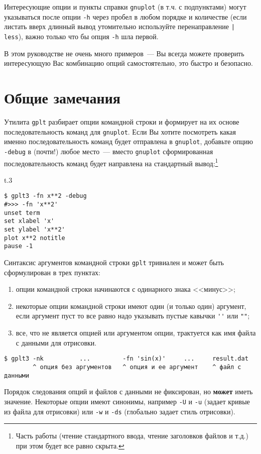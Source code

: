 \documentclass[12pt]{article}
\def\gplt{{\tt gplt}}
\def\gnuplot{{\tt gnuplot}}
\begin{document}
Интересующие опции и пункты справки \gnuplot{} (в т.ч. с подпунктами) могут указываться после опции \verb'-h' через пробел в любом порядке и количестве
(если листать вверх длинный вывод утомительно используйте перенаправление \verb'| less'), важно только что бы опция \verb'-h' шла первой.

В этом руководстве не очень много примеров~--- Вы всегда можете проверить интересующую Вас комбинацию опций самостоятельно, это быстро и безопасно. 
\pagebreak

\section{Общие замечания}
Утилита \gplt{} разбирает опции командной строки и формирует на их основе последовательность команд для \gnuplot. Если Вы хотите посмотреть
какая именно последовательность команд будет отправлена в \gnuplot, добавьте опцию \verb'-debug' в (почти!) любое место~--- вместо \gnuplot{}
сформированная последовательность команд будет направлена на стандартный вывод:\footnote{Часть работы
  (чтение стандартного ввода, чтение заголовков файлов и т.д.) при этом будет все равно скрыта.}
\begin{wrapfigure}[1]{t}{.3\textwidth}
  \vphantom{.}
  \vspace{-1.3cm}

\end{wrapfigure}
\begin{verbatim}
$ gplt3 -fn x**2 -debug
#>>> -fn 'x**2'
unset term
set xlabel 'x'
set ylabel 'x**2'
plot x**2 notitle   
pause -1
\end{verbatim}

Синтаксис аргументов командной строки \gplt{} тривиален и может быть сформулирован в трех пунктах:
\begin{enumerate}
\item опции командной строки начинаются с одинарного знака <<минус>>;
\item некоторые опции командной строки имеют один (и только один) аргумент, если аргумент пуст то все равно надо указывать пустые кавычки \verb|''| или \verb|""|;
\item все, что не является опцией или аргументом опции, трактуется как имя файла с данными для отрисовки.
\end{enumerate}
\begin{verbatim}
$ gplt3 -nk          ...         -fn 'sin(x)'     ...     result.dat
        ^ опция без аргументов   ^ опция и ее аргумент    ^ файл с данными
\end{verbatim}
Порядок следования опций и файлов с данными не фиксирован, но {\bf может} иметь значение.  Некоторые опции имеют синонимы, например \verb'-U' и \verb'-u'
(задает кривые из файла для отрисовки) или \verb'-w' и \verb'-ds' (глобально задает стиль отрисовки).
\end{document}
